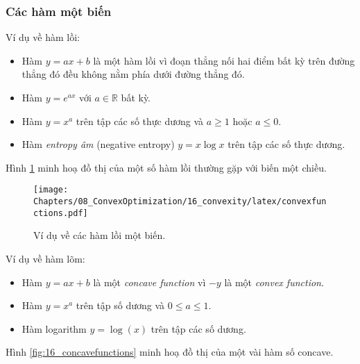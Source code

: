 \subsubsection{Các hàm một biến}
Ví dụ về hàm lồi:
\begin{itemize}
\item Hàm $ y = ax + b$ là một {hàm lồi} vì đoạn thẳng nối hai điểm
bất kỳ trên đường thẳng đó đều {không nằm phía dưới} đường thẳng đó.

\item Hàm $y = e^{ax}$ với $a \in \mathbb{R}$ bất kỳ.

\item Hàm $y = x^a$ trên tập các số thực dương và $a \geq 1$ hoặc $a \leq 0$.

\item Hàm \textit{entropy âm} (negative entropy) $y = x \log x$ trên tập các số thực dương.

\end{itemize}

Hình \ref{fig:16_convexfunctions} minh hoạ đồ thị của một số hàm lồi thường
gặp với biến một chiều.

\begin{figure}[t]
\myrule
\vspace{3mm}
\centering
\texttt{[image: Chapters/08\_ConvexOptimization/16\_convexity/latex/convexfunctions.pdf]}
\caption[]{Ví dụ về các hàm lồi một biến.}
\label{fig:16_convexfunctions}
\captionsetup[figure]{format=rule, justification=centering}
\end{figure}

Ví dụ về hàm lõm:
\begin{itemize}
\item Hàm $y = ax + b$ là một \textit{concave function} vì $-y$ là một \textit{convex function}.

\item Hàm $y = x^a$ trên tập số dương và $0 \leq a \leq 1$.

\item Hàm logarithm $y = \log(x)$ trên tập các số dương.
\end{itemize}

Hình \ref{fig:16_concavefunctions} minh hoạ đồ thị của một vài hàm số concave.

